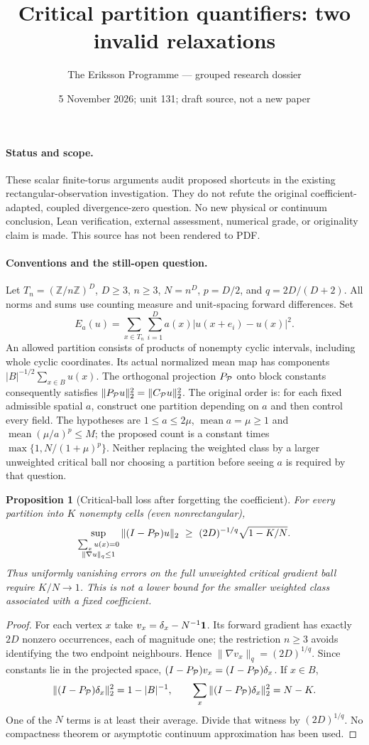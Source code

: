 \documentclass[11pt]{article}
\title{Critical partition quantifiers: two invalid relaxations}
\author{The Eriksson Programme --- grouped research dossier}
\date{5 November 2026; unit 131; draft source, not a new paper}
\newtheorem{proposition}{Proposition}
\begin{document}
\maketitle
\paragraph{Status and scope.}
These scalar finite-torus arguments audit proposed shortcuts in the existing
rectangular-observation investigation. They do not refute the original
coefficient-adapted, coupled divergence-zero question. No new physical or
continuum conclusion, Lean verification, external assessment, numerical grade,
or originality claim is made. This source has not been rendered to PDF.

\paragraph{Conventions and the still-open question.}
Let $T_n=(\mathbb Z/n\mathbb Z)^D$, $D\ge3$, $n\ge3$, $N=n^D$,
$p=D/2$, and $q=2D/(D+2)$. All norms and sums use counting measure and
unit-spacing forward differences. Set
\[
 E_a(u)=\sum_{x\in T_n}\sum_{i=1}^D
 a(x)|u(x+e_i)-u(x)|^2.
\]
An allowed partition consists of products of nonempty cyclic intervals,
including whole cyclic coordinates. Its actual normalized mean map has
components $|B|^{-1/2}\sum_{x\in B}u(x)$. The orthogonal projection $P_{\cal P}$
onto block constants consequently satisfies
$\|P_{\cal P}u\|_2^2=\|C_{\cal P}u\|_2^2$.
The original order is: for each fixed admissible spatial $a$, construct
one partition depending on $a$ and then control every field. The hypotheses are
$1\le a\le2\mu$, $\operatorname{mean}a=\mu\ge1$ and
$\operatorname{mean}(\mu/a)^p\le M$; the proposed count is a constant times
$\max\{1,N/(1+\mu)^p\}$. Neither replacing the weighted class by a larger
unweighted critical ball nor choosing a partition before seeing $a$ is required
by that question.

\begin{proposition}[Critical-ball loss after forgetting the coefficient]
For every partition into $K$ nonempty cells (even nonrectangular),
\[
 \sup_{\substack{\sum_xu(x)=0\\\|\nabla u\|_q\le1}}
 \|(I-P_{\cal P})u\|_2
 \ \ge\ (2D)^{-1/q}\sqrt{1-K/N}.
\]
Thus uniformly vanishing errors on the full unweighted critical gradient ball
require $K/N\to1$. This is not a lower bound for the smaller weighted class
associated with a fixed coefficient.
\end{proposition}
\begin{proof}
For each vertex $x$ take $v_x=\delta_x-N^{-1}{\bf1}$. Its forward gradient
has exactly $2D$ nonzero occurrences, each of magnitude one; the restriction
$n\ge3$ avoids identifying the two endpoint neighbours. Hence
$\|\nabla v_x\|_q=(2D)^{1/q}$. Since constants lie in the projected space,
$(I-P_{\cal P})v_x=(I-P_{\cal P})\delta_x$. If $x\in B$,
\[
 \|(I-P_{\cal P})\delta_x\|_2^2=1-|B|^{-1},\qquad
 \sum_x\|(I-P_{\cal P})\delta_x\|_2^2=N-K.
\]
One of the $N$ terms is at least their average. Divide that witness by
$(2D)^{1/q}$. No compactness theorem or asymptotic continuum approximation
has been used.
\end{proof}
\end{document}
